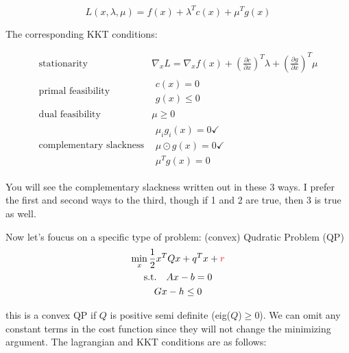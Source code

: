 \begin{equation}
    L(x,\lambda,\mu) = f(x) + \lambda^Tc(x)+\mu^Tg(x)
\end{equation}

The corresponding KKT conditions:

\begin{equation*}
    \begin{array}{c|c}
        \text{stationarity}            & \nabla _{x} L=\nabla _{x} f( x) +\left(\frac{\partial c}{\partial x}\right)^{T} \lambda +\left(\frac{\partial g}{\partial x}\right)^{T} \mu \\
        \hline
        \text{primal feasibility}      & \begin{array}{l}
            c( x) =0 \\
            g( x) \leqslant 0
        \end{array}                                                                                                                   \\
        \hline
        \text{dual feasibility}        & \mu \geqslant 0                                                                                                                             \\
        \hline
        \text{complementary slackness} & \begin{array}{l}
            \mu _{i} g_{i}( x) =0\checkmark \\
            \mu \odot g( x) =0\checkmark    \\
            \mu ^{T} g( x) =0
        \end{array}
    \end{array}
\end{equation*}

You will see the complementary slackness written out in these 3 ways. I prefer the first and second ways to the third, though if 1 and 2 are true, then 3 is true as well.

Now let's foucus on a specific type of problem: (convex) Qudratic Problem (QP)
\begin{gather*}
    \min_{x} \frac{1}{2}x^TQx+q^Tx+\textcolor{red}{r}\\
    \text{s.t.} \quad Ax-b =0\\
    Gx-h \le 0
\end{gather*}

this is a convex QP if $Q$ is positive semi definite (eig($Q$)$\ge$0). We can omit any constant terms in the cost function since they will not change the minimizing argument. The lagrangian and KKT conditions are as follows:

